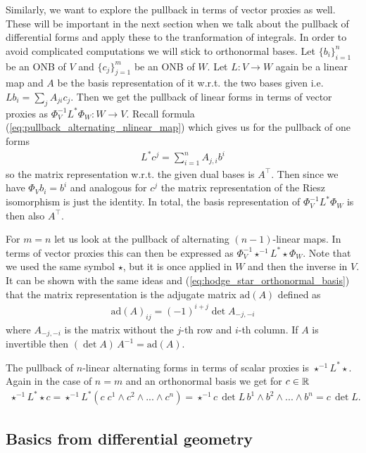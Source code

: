 \documentclass[../main.tex]{subfiles}
\begin{document}
Similarly, we want to explore the pullback in terms of vector proxies as well. 
These will be important in the next section when we talk about the pullback 
of differential forms and apply these to the tranformation of integrals.
In order to avoid complicated computations we will stick to orthonormal bases.
Let $\{ b_i \}_{i=1}^n$ be an ONB of $V$ and 
$\{ c_j \}_{j=1}^m$ be an ONB of $W$. Let $L : V \rightarrow W$ 
again be a linear map and $A$ be the basis representation of it w.r.t. 
the two bases given i.e. $L b_i = \sum_j A_{ji} c_j$. 
Then we get the pullback of linear forms in terms 
of vector proxies 
as $\Phi_V^{-1} L^* \Phi_W : W \rightarrow V$. Recall 
formula (\ref{eq:pullback_alternating_nlinear_map}) which 
gives us for the pullback of one forms 
\begin{align}
    L^* c^j = \sum_{i=1}^n A_{j,i} b^i \label{eq:pullback_linear_forms}
\end{align}
so the matrix representation w.r.t. the given dual bases is $A^\top$.
Then since we have $\Phi_V b_i = b^i$ and analogous for $c^j$
the matrix representation of the Riesz isomorphism is just the identity.
In total, the basis representation of $\Phi_V^{-1} L^* \Phi_W$ is then also 
$A^\top$.

For $m=n$ let us look at the pullback of alternating $(n-1)$-linear maps.
In terms of vector proxies this can then be expressed as 
$\Phi_V^{-1} \star^{-1} L^* \star \Phi_W$. Note that we used the same symbol 
$\star$, but it is once applied in $W$ and then the inverse in $V$. It 
can be shown with the same ideas and (\ref{eq:hodge_star_orthonormal_basis})
that the matrix representation is the adjugate matrix 
$\text{ad}(A)$ defined as 
\begin{align*}
    \text{ad}(A)_{ij} = (-1)^{i+j} \det A_{-j,-i}
\end{align*} 
where $A_{-j,-i}$ is the matrix without the $j$-th row and $i$-th column.
If $A$ is invertible then $(\det A)\,A^{-1} =  \text{ad}(A)$. 

The pullback of $n$-linear alternating forms in terms of scalar proxies is 
$\star^{-1} L^* \star$. Again in the case of $n=m$ and an 
orthonormal basis we get for $c \in \mathbb{R}$
\begin{align*}
    \star^{-1} L^* \star c = \star^{-1} L^* (c \; c^1 \wedge c^2 \wedge ... \wedge c^n)
    = \star^{-1} c\,\det L \,b^1 \wedge b^2 \wedge ... \wedge b^n = c\,\det L.
\end{align*}

\subsection{Basics from differential geometry}\label{sec:differential_geometry}
\end{document}
